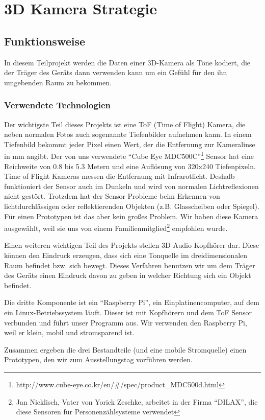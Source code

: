 \documentclass[a4paper,12pt,ngerman]{scrartcl}
\begin{document}
\newpage

\section{3D Kamera Strategie}

\subsection{Funktionsweise}

In diesem Teilprojekt werden die Daten einer 3D-Kamera als Töne kodiert, die der Träger des Geräts
dann verwenden kann um ein Gefühl für den ihn umgebenden Raum zu bekommen. 

\subsubsection{Verwendete Technologien}

Der wichtigste Teil dieses Projekts ist eine ToF (Time of Flight) Kamera, die neben normalen Fotos 
auch sogenannte Tiefenbilder aufnehmen kann.
In einem Tiefenbild bekommt jeder Pixel einen Wert, der die Entfernung zur Kameralinse in mm angibt.
Der von uns verwendete \enquote{Cube Eye MDC500C}\footnote{http://www.cube-eye.co.kr/en/\#/spec/product\_MDC500d.html}
Sensor hat eine Reichweite von 0.8 bis 5.3 Metern und eine Auflösung von 320x240 Tiefenpixeln. 
Time of Flight Kameras messen die Entfernung mit Infrarotlicht. Deshalb funktioniert der Sensor auch 
im Dunkeln und wird von normalen Lichtreflexionen nicht gestört. Trotzdem hat der Sensor Probleme beim
Erkennen von lichtdurchlässigen oder reflektierenden Objekten (z.B. Glasscheiben oder Spiegel). Für einen
Prototypen ist das aber kein großes Problem. Wir haben diese Kamera ausgewählt, weil sie uns von einem 
Familienmitglied\footnote{Jan Nicklisch, Vater von Yorick Zeschke, arbeitet in der Firma
	\enquote{DILAX}, die diese Sensoren für Personenzählsysteme verwendet} 
empfohlen wurde.\par
Einen weiteren wichtigen Teil des Projekts stellen 3D-Audio Kopfhörer dar. Diese können den Eindruck
erzeugen, dass sich eine Tonquelle im dreidimensionalen
Raum befindet bzw. sich bewegt. Dieses Verfahren benutzen wir um dem Träger des Geräts einen Eindruck
davon zu geben in welcher Richtung sich ein Objekt befindet.\par 
Die dritte Komponente ist ein \enquote{Raspberry Pi}, ein 
Einplatinencomputer, auf dem ein Linux-Betriebssystem läuft. Dieser ist mit Kopfhörern und dem ToF Sensor 
verbunden und führt unser Programm aus. Wir verwenden den Raspberry Pi, weil er klein, mobil und 
stromsparend ist.\par 
Zusammen ergeben die drei Bestandteile (und eine mobile Stromquelle) einen Prototypen, den wir zum Ausstellungstag vorführen werden.
\end{document}
